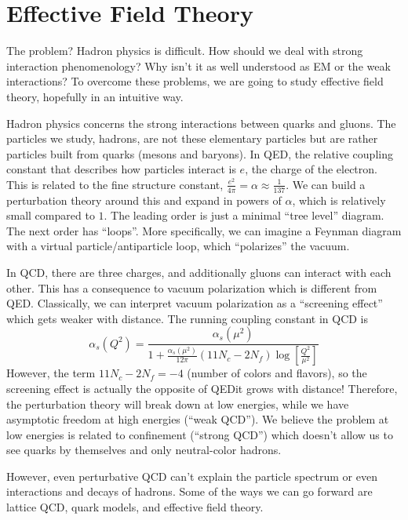 \documentclass[a4paper,twoside,master.tex]{subfiles}
\begin{document}

\section{Effective Field Theory}
\label{sec:effective_field_theory}

The problem? Hadron physics is difficult. How should we deal with strong interaction phenomenology? Why isn't it as well understood as EM or the weak interactions? To overcome these problems, we are going to study effective field theory, hopefully in an intuitive way.


Hadron physics concerns the strong interactions between quarks and gluons. The particles we study, hadrons, are not these elementary particles but are rather particles built from quarks (mesons and baryons). In QED, the relative coupling constant that describes how particles interact is $ e $, the charge of the electron. This is related to the fine structure constant, $ \frac{e^2}{4 \pi} = \alpha \approx \frac{1}{137} $. We can build a perturbation theory around this and expand in powers of $ \alpha $, which is relatively small compared to $ 1 $. The leading order is just a minimal ``tree level'' diagram. The next order has ``loops''. More specifically, we can imagine a Feynman diagram with a virtual particle/antiparticle loop, which ``polarizes'' the vacuum.


In QCD, there are three charges, and additionally gluons can interact with each other. This has a consequence to vacuum polarization which is different from QED. Classically, we can interpret vacuum polarization as a ``screening effect'' which gets weaker with distance. The running coupling constant in QCD is
\begin{equation}
    \alpha_s(Q^2) = \frac{\alpha_s(\mu^2)}{1 + \frac{\alpha_s(\mu^2)}{12 \pi} (11 N_c - 2 N_f) \log[\frac{Q^2}{\mu^2}]}
\end{equation}
However, the term $ 11 N_c - 2 N_f = -4 $ (number of colors and flavors), so the screening effect is actually the opposite of QED\textemdash it grows with distance! Therefore, the perturbation theory will break down at low energies, while we have asymptotic freedom at high energies (``weak QCD''). We believe the problem at low energies is related to confinement (``strong QCD'') which doesn't allow us to see quarks by themselves and only neutral-color hadrons.

However, even perturbative QCD can't explain the particle spectrum or even interactions and decays of hadrons. Some of the ways we can go forward are lattice QCD, quark models, and effective field theory.
\end{document}
